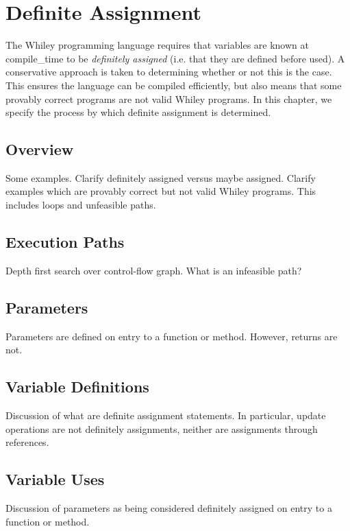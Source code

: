 \chapter{Definite Assignment}
\label{c_definite_assignment}

The Whiley programming language requires that variables are known at \gls{compile_time} to be {\em definitely assigned} (i.e. that they are defined before used).  A conservative approach is taken to determining whether or not this is the case.  This ensures the language can be compiled efficiently, but also means that some provably correct programs are not valid Whiley programs.  In this chapter, we specify the process by which definite assignment is determined.

\section{Overview}

Some examples.  Clarify definitely assigned versus maybe assigned.  Clarify examples which are provably correct but not valid Whiley programs.  This includes loops and unfeasible paths.

\section{Execution Paths}

Depth first search over control-flow graph.  What is an infeasible path?

\section{Parameters}

Parameters are defined on entry to a function or method.  However, returns are not.

\section{Variable Definitions}

Discussion of what are definite assignment statements.  In particular, update operations are not definitely assignments, neither are assignments through references.

\section{Variable Uses}

Discussion of parameters as being considered definitely assigned on entry to a function or method.

